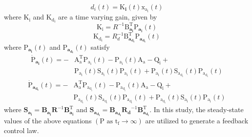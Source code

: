 \documentclass[conference]{IEEEtran}
\begin{document}
\begin{equation}
	{{d_i}}(t) = \boldsymbol{{\mathrm{K}}_{i}}(t)\boldsymbol{{\mathrm{x_{a_i}}}}(t)
\end{equation}
where $\boldsymbol{{\mathrm{K_i}}}$ and $\boldsymbol{{\mathrm{K_{d_i}}}}$ are a time varying gain, given by
\begin{equation}
	\boldsymbol{{\mathrm{K_i}}} = {{{R}}^{-1}}\boldsymbol{{\mathrm{B}_{a_i}^\mathrm{T}}}\boldsymbol{{\mathrm{P}}_{a_i}}(t)
\end{equation}
\begin{equation}
	\boldsymbol{{\mathrm{K_{d_i}}}} = {{{R}}^{-1}_{d}}\boldsymbol{{\mathrm{B}_{a_{d_i}}^\mathrm{T}}}\boldsymbol{{\mathrm{P}}_{a_{d_i}}}(t)
\end{equation}
where $\boldsymbol{{\mathrm{P}}_{a_i}}(t)$ and $\boldsymbol{{\mathrm{P}}_{a_{d_i}}}(t)$ satisfy
\begin{equation}\label{coupled_riccatti_LQIDG}
        \begin{split}
            \boldsymbol{\dot{\mathrm{P}}_{a_i}}(t) = -&\boldsymbol{\mathrm{A^\mathrm{T}_a}}\boldsymbol{\mathrm{P_{a_i}}}(t) - \boldsymbol{\mathrm{P_{a_i}}}(t)\boldsymbol{\mathrm{A_a}} - \boldsymbol{\mathrm{Q_i}} +\\ &\boldsymbol{\mathrm{P_{a_i}}}(t)\boldsymbol{\mathrm{S_{a_i}}}(t)\boldsymbol{\mathrm{P_{a_i}}}(t) + \boldsymbol{\mathrm{P_{a_i}}}(t)\boldsymbol{\mathrm{S_{a_{d_i}}}}(t)\boldsymbol{\mathrm{P_{a_{d_i}}}}(t)
        \end{split}
	\end{equation}
	\begin{equation}
        \begin{split}
            \boldsymbol{\dot{\mathrm{P}}_{a_{d_i}}}(t) = -&\boldsymbol{\mathrm{A^\mathrm{T}_a}}\boldsymbol{\mathrm{P_{a_{d_i}}}}(t) - \boldsymbol{\mathrm{P_{a_{d_i}}}}(t)\boldsymbol{\mathrm{A_a}} - \boldsymbol{\mathrm{Q_{i}}} +\\ &\boldsymbol{\mathrm{P_{a_{d_i}}}}(t)\boldsymbol{\mathrm{S_{a_{d_i}}}}(t)\boldsymbol{\mathrm{P_{a_{d_i}}}}(t) + \boldsymbol{\mathrm{P_{a_{d_i}}}}(t)\boldsymbol{\mathrm{S_{a_i}}}(t)\boldsymbol{\mathrm{P_{a_i}}}(t)
        \end{split}
\end{equation}
where $\boldsymbol{S_{a_i}} = \boldsymbol{B_{a_i}R}^{-1}\boldsymbol{B^\mathrm{T}_{a_i}}$ and $\boldsymbol{S_{a_{d_i}}} = \boldsymbol{B_{a_{d_i}}R_{d}}^{-1}\boldsymbol{B^\mathrm{T}_{a_{d_i}}}$.
In this study, the steady-state values of the above equations $(\boldsymbol{{\mathrm{P}}} \text{ as } \mathrm{t_f} \to \infty)$ are utilized to generate a feedback control law.
\end{document}
